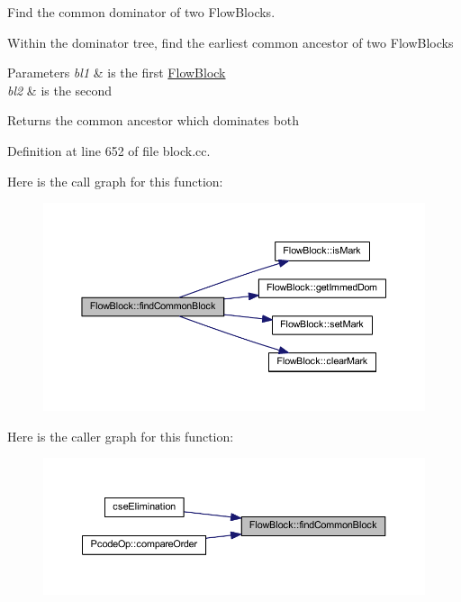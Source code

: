 Find the common dominator of two Flow\+Blocks. 

Within the dominator tree, find the earliest common ancestor of two Flow\+Blocks 
\begin{DoxyParams}{Parameters}
{\em bl1} & is the first \mbox{\hyperlink{class_flow_block}{Flow\+Block}} \\
\hline
{\em bl2} & is the second \\
\hline
\end{DoxyParams}
\begin{DoxyReturn}{Returns}
the common ancestor which dominates both 
\end{DoxyReturn}


Definition at line 652 of file block.\+cc.

Here is the call graph for this function\+:
\nopagebreak
\begin{figure}[H]
\begin{center}
\leavevmode
\includegraphics[width=350pt]{class_flow_block_a5c7762af431a7897d31d51f6391926c2_cgraph}
\end{center}
\end{figure}
Here is the caller graph for this function\+:
\nopagebreak
\begin{figure}[H]
\begin{center}
\leavevmode
\includegraphics[width=350pt]{class_flow_block_a5c7762af431a7897d31d51f6391926c2_icgraph}
\end{center}
\end{figure}
\mbox{\label{class_flow_block_a263ec50d30f807a8e1286ac37c6728ce}} 
